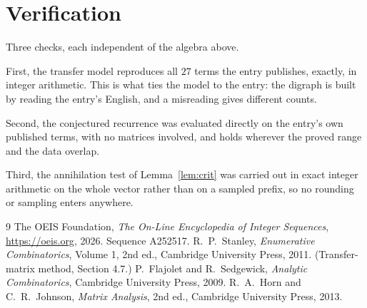 \documentclass[11pt,a4paper]{article}
\theoremstyle{plain}
\theoremstyle{definition}
\begin{document}
\section{Verification}

Three checks, each independent of the algebra above.

First, the transfer model reproduces all $27$ terms the entry publishes, exactly, in
integer arithmetic. This is what ties the model to the entry: the digraph is built by reading
the entry's English, and a misreading gives different counts.

Second, the conjectured recurrence was evaluated directly on the entry's own published terms,
with no matrices involved, and holds wherever the proved range and the data overlap.

Third, the annihilation test of Lemma~\ref{lem:crit} was carried out in exact integer
arithmetic on the whole vector rather than on a sampled prefix, so no rounding or sampling
enters anywhere.

\begin{thebibliography}{9}
 The OEIS Foundation, \emph{The On-Line Encyclopedia of Integer
Sequences}, \url{https://oeis.org}, 2026. Sequence A252517.
 R.~P.~Stanley, \emph{Enumerative Combinatorics}, Volume 1, 2nd ed.,
Cambridge University Press, 2011. (Transfer-matrix method, Section 4.7.)
 P.~Flajolet and R.~Sedgewick, \emph{Analytic Combinatorics}, Cambridge
University Press, 2009.
 R.~A.~Horn and C.~R.~Johnson, \emph{Matrix Analysis}, 2nd ed., Cambridge
University Press, 2013.
\end{thebibliography}
\end{document}
